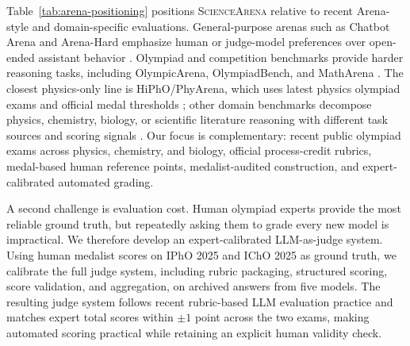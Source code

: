 \documentclass[11pt]{article}
\begin{document}
Table~\ref{tab:arena-positioning} positions \textsc{ScienceArena} relative to recent Arena-style and domain-specific evaluations.
General-purpose arenas such as Chatbot Arena and Arena-Hard emphasize human or judge-model preferences over open-ended assistant behavior \citep{chiang2024chatbotarena,li2024arenahard}.
Olympiad and competition benchmarks provide harder reasoning tasks, including OlympicArena, OlympiadBench, and MathArena \citep{huang2024olympicarena,he2024olympiadbench,balunovic2025matharena}.
The closest physics-only line is HiPhO/PhyArena, which uses latest physics olympiad exams and official medal thresholds \citep{yu2025hipho}; other domain benchmarks decompose physics, chemistry, biology, or scientific literature reasoning with different task sources and scoring signals \citep{dai2025physicsarena,zhao2025superchem,zhou2026babe,zhao2025sciarena}.
Our focus is complementary: recent public olympiad exams across physics, chemistry, and biology, official process-credit rubrics, medal-based human reference points, medalist-audited construction, and expert-calibrated automated grading.






A second challenge is evaluation cost.
Human olympiad experts provide the most reliable ground truth, but repeatedly asking them to grade every new model is impractical.
We therefore develop an expert-calibrated LLM-as-judge system.
Using human medalist scores on IPhO 2025 and IChO 2025 as ground truth, we calibrate the full judge system, including rubric packaging, structured scoring, score validation, and aggregation, on archived answers from five models.
The resulting judge system follows recent rubric-based LLM evaluation practice \citep{zheng2023judging,rao2026autorubric} and matches expert total scores within $\pm 1$ point across the two exams, making automated scoring practical while retaining an explicit human validity check.
\end{document}
